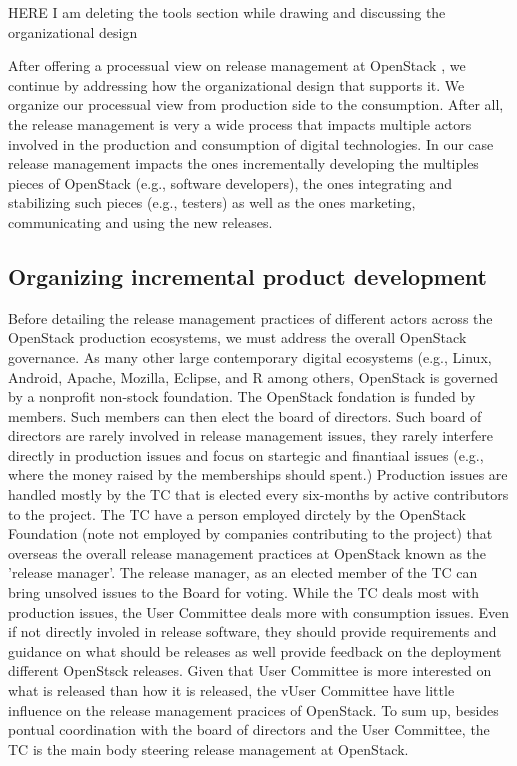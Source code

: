 \documentclass[dvipsnames]{interact}
\theoremstyle{plain}\newtheorem{theorem}{Theorem}[section]
\theoremstyle{definition}
\theoremstyle{remark}
\newenvironment{newStuff}{
    \begin{color}{Sepia}
    \begin{tabular}{|p{1.0\textwidth}|}
    \hline\\
    }
    { 
    \\\\\hline
    \end{tabular} 
    \end{color}
    }
\renewenvironment{newStuff}{}{}
\begin{document}
\begin{newStuff}
 HERE I am deleting the tools section while drawing and discussing the organizational design 
 
After offering a processual view on release management at OpenStack , we continue by addressing how the organizational design that supports it. We  organize our processual view from production side to the consumption. After all, the release management is very a wide process that impacts  multiple actors involved in the production and consumption of digital technologies. In our case release management impacts the ones incrementally developing the multiples pieces of OpenStack (e.g., software developers), the ones integrating and stabilizing such pieces (e.g., testers) as well as the ones marketing, communicating and using the new releases. 

\subsection{Organizing incremental product development}



Before detailing the release management practices of different actors across the OpenStack production ecosystems, we must address the overall OpenStack governance. As many other large contemporary digital ecosystems (e.g., Linux, Android, Apache, Mozilla, Eclipse, and R among others, OpenStack is governed by a nonprofit non-stock foundation. The OpenStack fondation is funded by members. Such members can then elect the board of directors. Such board of directors are rarely involved in release management issues, they rarely interfere directly in production issues and focus on startegic and finantiaal issues (e.g., where the money raised by the memberships should spent.) Production issues are handled mostly by the \ac{TC} that is elected every six-months by active contributors to the project. The \ac{TC} have a person employed dirctely by the OpenStack Foundation (note not employed by companies contributing to the project) that overseas the overall release management practices at OpenStack known as the 'release manager'. The release manager, as an elected member of the \ac{TC} can bring unsolved issues to the  Board for voting.  While the \ac{TC} deals most with production issues, the  \ac{User Committee} deals more with consumption issues. Even if not directly involed in release software, they should provide requirements and guidance on what should be releases as well provide feedback on the deployment different OpenStsck releases. Given that \ac{User Committee} is more interested on what is released than how it is released, the v\ac{User Committee} have little influence on the release management pracices of OpenStack. To sum up, besides pontual coordination with the board of directors and the  User Committee, the \ac{TC} is the main body steering release management at OpenStack.  


\end{newStuff}
\end{document}
